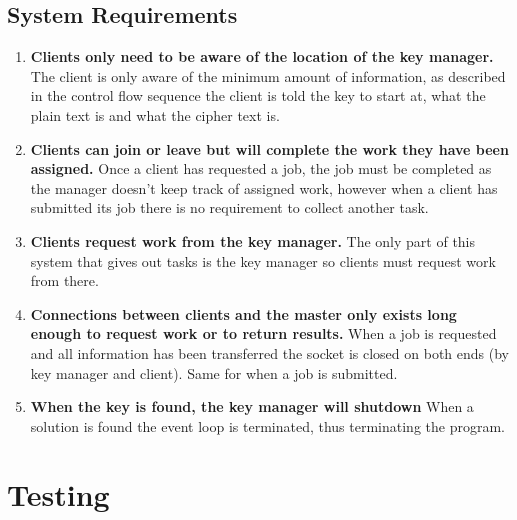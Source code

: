 \documentclass[a4paper, 12pt]{article}
\begin{document}
  		\subsection{System Requirements}  		
  			\begin{enumerate}
  				\item \textbf{Clients only need to be aware of the location of the key manager.} The client is only aware of the minimum amount of information, as described in the control flow sequence the client is told the key to start at, what the plain text is and what the cipher text is.
  			
  				\item \textbf{Clients can join or leave but will complete the work they have been assigned.} Once a client has requested a job, the job must be completed as the manager doesn't keep track of assigned work, however when a client has submitted its job there is no requirement to collect another task.
  			
  				\item \textbf{Clients request work from the key manager.} The only part of this system that gives out tasks is the key manager so clients must request work from there.
  				
  				\item \textbf{Connections between clients and the master only exists long enough to request work or to return results.} When a job is requested and all information has been transferred the socket is closed on both ends (by key manager and client). Same for when a job is submitted.
  				
  				\item \textbf{When the key is found, the key manager will shutdown} When a solution is found the event loop is terminated, thus terminating the program.
  			\end{enumerate}
  		
  	\section{Testing}
\end{document}

